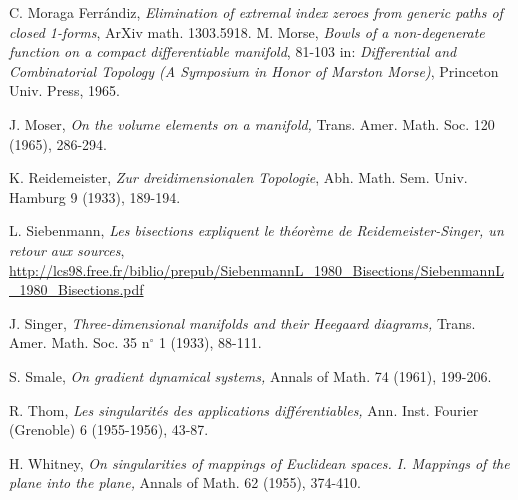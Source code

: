 \documentclass[12pt]{amsart}
\begin{document}
\begin{thebibliography}{99}

 C. Moraga Ferr\'andiz, {\it Elimination of extremal index zeroes from generic paths of closed 1-forms}, ArXiv math. 1303.5918.
 M. Morse, {\it Bowls of a non-degenerate function on a compact differentiable 
manifold}, 81-103 in: {\it Differential and Combinatorial Topology (A Symposium in Honor of Marston Morse)}, Princeton Univ. Press, 1965.

 J. Moser, {\it On the volume elements on a manifold,} Trans. Amer. Math. Soc.
120 (1965), 286-294.

 K. Reidemeister, {\it Zur dreidimensionalen Topologie},
Abh. Math. Sem. Univ. Hamburg 9 (1933), 189-194.

 L. Siebenmann, {\it Les bisections expliquent le th\'eor\`eme de Reidemeister-Singer, un retour aux sources},
\href{http://lcs98.free.fr/biblio/prepub/SiebenmannL_1980_Bisections/SiebenmannL_1980_Bisections.pdf}{http://lcs98.free.fr/biblio/prepub/SiebenmannL\_1980\_Bisections/SiebenmannL\_1980\_Bisections.pdf}

 J. Singer, {\it 
Three-dimensional manifolds and their Heegaard
diagrams,} Trans. Amer. Math. Soc. 35 n$^\circ$ 1 (1933), 88-111. 

 S. Smale, {\it On gradient dynamical systems,} Annals of Math.
74 (1961), 199-206.

    R. Thom, {\it Les singularit\'es des applications diff\'erentiables,} Ann. Inst. Fourier (Grenoble) 6 (1955-1956), 43-87.

  H. Whitney,  {\it On singularities of mappings of Euclidean spaces. I. Mappings
of the plane into the plane,} Annals of Math. 62 (1955), 374-410.

 \end{thebibliography}
\end{document}
